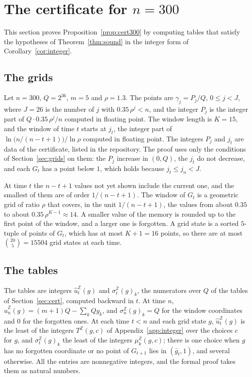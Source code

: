 \documentclass[11pt]{amsart}
\theoremstyle{definition}
\numberwithin{equation}{section}
\newcommand{\computed}[1]{\ignorespaces}
\begin{document}
\section{\texorpdfstring{The certificate for $n=300$}{The certificate for n=300}}\label{sec:run}

This section proves Proposition~\ref{prop:cert300} by computing tables that satisfy the hypotheses of Theorem~\ref{thm:sound} in the integer form of Corollary~\ref{cor:integer}.

\subsection{The grids}\label{sec:grids300}\computed{code/soq/out/grid-m5-n300-r1.3-w0.35-14.txt, code/gp/numbers.gp, code/gp/numbers.out}
Let $n=300$, $Q=2^{36}$, $m=5$ and $\rho=1.3$. The points are $\gamma_j=P_j/Q$, $0\le j<J$, where $J=26$ is the number of $j$ with $0.35\,\rho^j<n$, and the integer $P_j$ is the integer part of $Q\cdot0.35\,\rho^j/n$ computed in floating point. The window length is $K=15$, and the window of time $t$ starts at $j_t$, the integer part of $\ln\bigl(n/(n-t+1)\bigr)/\ln\rho$ computed in floating point. The integers $P_j$ and $j_t$ are data of the certificate, listed in the repository. The proof uses only the conditions of Section~\ref{sec:grids} on them: the $P_j$ increase in $(0,Q)$, the $j_t$ do not decrease, and each $G_t$ has a point below $1$, which holds because $j_t\le j_n<J$.

At time $t$ the $n-t+1$ values not yet shown include the current one, and the smallest of them are of order $1/(n-t+1)$. The window of $G_t$ is a geometric grid of ratio $\rho$ that covers, in the unit $1/(n-t+1)$, the values from about $0.35$ to about $0.35\,\rho^{K-1}\approx14$. A smaller value of the memory is rounded up to the first point of the window, and a larger one is forgotten. A grid state is a sorted $5$-tuple of points of $G_t$, which has at most $K+1=16$ points, so there are at most $\binom{20}{5}=15504$ grid states at each time.

\subsection{The tables}\label{sec:tables}\computed{code/soq/src/bin/soq.rs, code/soq/out/soq-m5-n300-r1.3-w0.35-14.txt, code/gp/numbers.gp, code/gp/numbers.out}
The tables are integers $\hat u^{\mathbb Z}_t(g)$ and $\sigma^{\mathbb Z}_t(g)_k$, the numerators over $Q$ of the tables of Section~\ref{sec:cert}, computed backward in $t$. At time $n$, $\hat u^{\mathbb Z}_n(g)=(m+1)Q-\sum_kQg_k$, and $\sigma^{\mathbb Z}_n(g)_k=Q$ for the window coordinates and $0$ for the forgotten ones. At each time $t<n$ and each grid state $g$, $\hat u^{\mathbb Z}_t(g)$ is the least of the integers $T^{\mathbb Z}(g,c)$ of Appendix~\ref{app:integer} over the choices $c$ for $g$, and $\sigma^{\mathbb Z}_t(g)_k$ the least of the integers $\mu^{\mathbb Z}_k(g,c)$; there is one choice when $g$ has no forgotten coordinate or no point of $G_{t+1}$ lies in $(\bar g_t,1)$, and several otherwise. All the entries are nonnegative integers, and the formal proof takes them as natural numbers.
\end{document}
